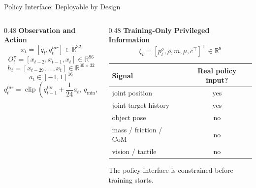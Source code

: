 \documentclass{beamer}
\begin{document}
\begin{frame}{Policy Interface: Deployable by Design}
    \footnotesize
    \vspace{0.6em}
    \begin{columns}[T,onlytextwidth]
        \begin{column}{0.48\textwidth}
            \textbf{\textcolor{maincolor}{Observation and Action}}
            \[
                x_t=[\tilde q_t,q_t^{tar}]\in\mathbb{R}^{32}
            \]
            \[
                O_t^\pi=[x_{t-2},x_{t-1},x_t]\in\mathbb{R}^{96}
            \]
            \[
                h_t=[x_{t-29},\ldots,x_t]\in\mathbb{R}^{30\times32}
            \]
            \[
                a_t\in[-1,1]^{16}
            \]
            \[
                q_t^{tar}
                =
                \operatorname{clip}
                \left(q_{t-1}^{tar}+\frac{1}{24}a_t,\ q_{\min},q_{\max}\right)
            \]
        \end{column}
        \begin{column}{0.48\textwidth}
            \textbf{\textcolor{maincolor}{Training-Only Privileged Information}}
            \[
                \xi_t =
                [p_t^o,\rho,m,\mu,c^\top]^\top
                \in\mathbb{R}^{9}
            \]

            \vspace{0.2em}
            \begin{tabular}{p{}c}
                \hline
                Signal & Real policy input? \\
                \hline
                joint position & yes \\
                joint target history & yes \\
                object pose & no \\
                mass / friction / CoM & no \\
                vision / tactile & no \\
                \hline
            \end{tabular}

            \vspace{0.45em}
            \centering
            \textcolor{maincolor}{The policy interface is constrained before training starts.}
        \end{column}
    \end{columns}
\end{frame}
\end{document}
